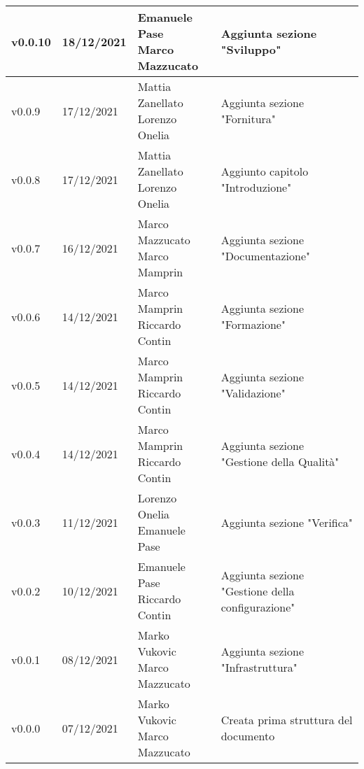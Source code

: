 \begin{center}
\begin{tabular}{|p{2cm}|p{2cm}|p{4cm}|p{5cm}|}
    v0.0.10            & 18/12/2021    & \aCapo{Emanuele Pase\\Marco Mazzucato} & Aggiunta sezione "Sviluppo" \\ \hline
    v0.0.9            & 17/12/2021    & \aCapo{Mattia Zanellato\\Lorenzo Onelia} & Aggiunta sezione "Fornitura" \\ \hline
    v0.0.8            & 17/12/2021    & \aCapo{Mattia Zanellato\\Lorenzo Onelia} & Aggiunto capitolo "Introduzione" \\ \hline
    v0.0.7            & 16/12/2021    & \aCapo{Marco Mazzucato\\Marco Mamprin} & Aggiunta sezione "Documentazione" \\ \hline
    v0.0.6            & 14/12/2021    & \aCapo{Marco Mamprin\\Riccardo Contin} & Aggiunta sezione "Formazione" \\ \hline
    v0.0.5            & 14/12/2021    & \aCapo{Marco Mamprin\\Riccardo Contin}   & Aggiunta sezione "Validazione" \\ \hline
    v0.0.4            & 14/12/2021    & \aCapo{Marco Mamprin\\Riccardo Contin}   & Aggiunta sezione "Gestione della Qualità" \\ \hline
    v0.0.3            & 11/12/2021    & \aCapo{Lorenzo Onelia\\Emanuele Pase} & Aggiunta sezione "Verifica" \\ \hline
    v0.0.2            & 10/12/2021    & \aCapo{Emanuele Pase\\Riccardo Contin}  & Aggiunta sezione "Gestione della configurazione" \\ \hline
    v0.0.1            & 08/12/2021    & \aCapo{Marko Vukovic\\Marco Mazzucato}   & Aggiunta sezione "Infrastruttura" \\ \hline
    v0.0.0            & 07/12/2021    & \aCapo{Marko Vukovic\\Marco Mazzucato}   & Creata prima struttura del documento \\ \hline
  \end{tabular}
\end{center}
